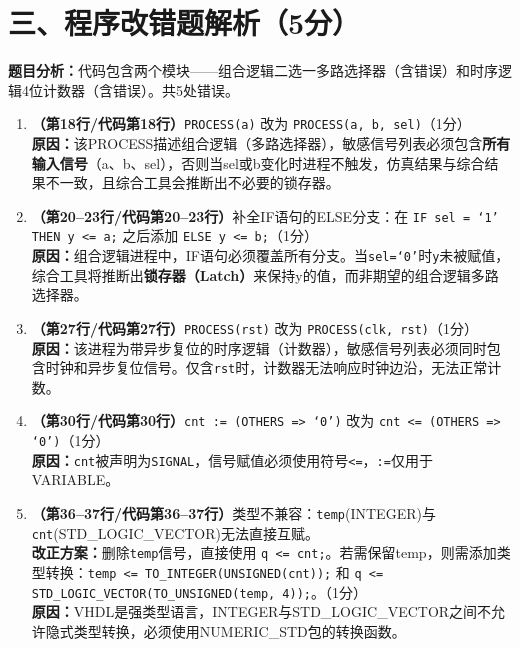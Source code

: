 \section{三、程序改错题解析（5分）}

\textbf{题目分析：}代码包含两个模块——组合逻辑二选一多路选择器（含错误）和时序逻辑4位计数器（含错误）。共5处错误。

\begin{enumerate}[label={错误\arabic*：}]

\item \textbf{（第18行/代码第18行）}\texttt{PROCESS(a)} 改为 \texttt{PROCESS(a, b, sel)}\hfill（1分）\\
\textbf{原因：}该PROCESS描述组合逻辑（多路选择器），敏感信号列表必须包含\textbf{所有输入信号}（a、b、sel），否则当sel或b变化时进程不触发，仿真结果与综合结果不一致，且综合工具会推断出不必要的锁存器。

\item \textbf{（第20--23行/代码第20--23行）}补全IF语句的ELSE分支：在 \texttt{IF sel = `1' THEN y <= a;} 之后添加 \texttt{ELSE y <= b;}\hfill（1分）\\
\textbf{原因：}组合逻辑进程中，IF语句必须覆盖所有分支。当\texttt{sel=`0'}时\texttt{y}未被赋值，综合工具将推断出\textbf{锁存器（Latch）}来保持y的值，而非期望的组合逻辑多路选择器。

\item \textbf{（第27行/代码第27行）}\texttt{PROCESS(rst)} 改为 \texttt{PROCESS(clk, rst)}\hfill（1分）\\
\textbf{原因：}该进程为带异步复位的时序逻辑（计数器），敏感信号列表必须同时包含时钟和异步复位信号。仅含\texttt{rst}时，计数器无法响应时钟边沿，无法正常计数。

\item \textbf{（第30行/代码第30行）}\texttt{cnt := (OTHERS => `0')} 改为 \texttt{cnt <= (OTHERS => `0')}\hfill（1分）\\
\textbf{原因：}\texttt{cnt}被声明为\texttt{SIGNAL}，信号赋值必须使用符号\verb|<=|，\verb|:=|仅用于VARIABLE。

\item \textbf{（第36--37行/代码第36--37行）}类型不兼容：\texttt{temp}(INTEGER)与\texttt{cnt}(STD\_LOGIC\_VECTOR)无法直接互赋。\\
\textbf{改正方案：}删除\texttt{temp}信号，直接使用 \texttt{q <= cnt;}。若需保留temp，则需添加类型转换：\texttt{temp <= TO\_INTEGER(UNSIGNED(cnt));} 和 \texttt{q <= STD\_LOGIC\_VECTOR(TO\_UNSIGNED(temp, 4));}。\hfill（1分）\\
\textbf{原因：}VHDL是强类型语言，INTEGER与STD\_LOGIC\_VECTOR之间不允许隐式类型转换，必须使用NUMERIC\_STD包的转换函数。

\end{enumerate}

